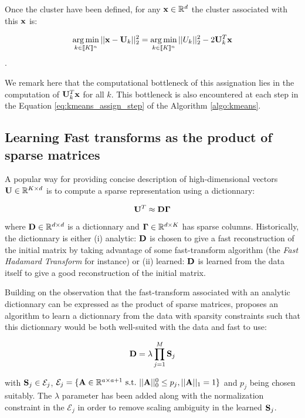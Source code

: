 \documentclass{article}
\def\rmGamma{{\mathbf{\Gamma}}}
\begin{document}
Once the cluster have been defined, for any ${\mathbf{x}} \in \mathbb{R}^d$ the cluster associated with this ${\mathbf{x}}$ is:

\begin{equation}
\label{eq:assignation_problem_kmeans}
\operatorname*{arg\,min}_{k \in [\![K]\!]^n} ||{\mathbf{x}} - {\mathbf{U}}_{k}||_2^2 = \operatorname*{arg\,min}_{k \in [\![K]\!]^n} ||U_k||_2^2 - 2 {\mathbf{U}}_{k}^T{\mathbf{x}}
\end{equation}.

We remark here that the computational bottleneck of this assignation lies in the computation of ${\mathbf{U}}_k^T{\mathbf{x}}$ for all $k$. This bottleneck is also encountered at each step in the Equation \ref{eq:kmeans_assign_step} of the Algorithm \ref{algo:kmeans}.


\subsection{Learning Fast transforms as the product of sparse matrices}

A popular way for providing concise description of high-dimensional vectors ${\mathbf{U}} \in \mathbb{R}^{K \times d}$ is to compute a sparse representation using a dictionnary:

\begin{equation}
\rmU^T \approx \rmD\rmGamma
\end{equation}

where ${\mathbf{D}} \in \mathbb{R}^{d \times d}$ is a dictionnary and $\rmGamma \in \R^{d \times K}$ has sparse columns. Historically, the dictionnary is either (i) analytic: ${\mathbf{D}}$ is chosen to give a fast reconstruction of the initial matrix by taking advantage of some fast-transform algorithm (the \textit{Fast Hadamard Transform} for instance) or (ii) learned: ${\mathbf{D}}$ is learned from the data itself to give a good reconstruction of the initial matrix.

Building on the observation that the fast-transform associated with an analytic dictionnary can be expressed as the product of sparse matrices, \cite{magoarou2014learning} proposes an algorithm to learn a dictionnary from the data with sparsity constraints such that this dictionnary would be both well-suited with the data and fast to use:

\begin{equation}
{\mathbf{D}} = \lambda \prod_{j=1}^{M}{\mathbf{S}}_j
\end{equation}

with ${\mathbf{S}}_j \in \mathcal{E}_j$, $\mathcal{E}_j = \lbrace {\mathbf{A}} \in \mathbb{R}^{a \times a+1}~\text{s.t.}~||{\mathbf{A}}||_0^0 \leq p_j, ||{\mathbf{A}}||_1 = 1 \rbrace$ and $p_j$ being chosen suitably. The $\lambda$ parameter has been added along with the normalization constraint in the $\mathcal{E}_j$ in order to remove scaling ambiguity in the learned ${\mathbf{S}}_j$.
\end{document}
